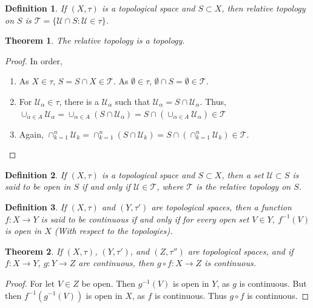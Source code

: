 \documentclass[12pt,oneside]{book}
\theoremstyle{mystyle}
\newtheorem{theorem}{Theorem}[section]
\newtheorem{definition}{Definition}[section]
\begin{document}
\begin{definition}
If $(X,\tau)$ is a topological space and $S\subset X$, then relative topology on $S$ is $\mathscr{T}=\{\mathcal{U}\cap S:\mathcal{U}\in \tau\}$.
\end{definition}

\begin{theorem}
The relative topology is a topology.
\end{theorem}
\begin{proof}
In order,
\begin{enumerate}
\item As $X\in \tau$, $S=S\cap X \in \mathscr{T}$. As $\emptyset\in \tau$, $\emptyset\cap S = \emptyset \in \mathscr{T}$. 
\item For $\mathscr{U}_\alpha\in \mathscr{\tau}$, there is a $\mathcal{U}_\alpha$ such that $\mathscr{U}_\alpha = S\cap \mathcal{U}_\alpha$. Thus, $\cup_{\alpha \in A} \mathscr{U}_\alpha = \cup_{\alpha \in A}(S\cap \mathcal{U}_\alpha) = S\cap (\cup_{\alpha \in A}\mathscr{U}_\alpha)\in \mathscr{T}$
\item Again, $\cap_{k=1}^{n} \mathscr{U}_k = \cap_{k=1}^{n}(S\cap \mathcal{U}_k) = S\cap (\cap_{k=1}^{n} \mathcal{U}_k)\in \mathscr{T}$.
\end{enumerate}
\end{proof}

\begin{definition}
If $(X,\tau)$ is a topological space and $S\subset X$, then a set $\mathcal{U}\subset S$ is said to be open in $S$ if and only if $\mathcal{U}\in \mathscr{T}$, where $\mathscr{T}$ is the relative topology on $S$.
\end{definition}

\begin{definition}
If $(X,\tau)$ and $(Y,\tau')$ are topological spaces, then a function $f:X\rightarrow Y$ is said to be continuous if and only if for every open set $V\in Y$, $f^{-1}(V)$ is open in $X$ (With respect to the topologies).
\end{definition}

\begin{theorem}
If $(X,\tau)$, $(Y,\tau')$, and $(Z,\tau'')$ are topological spaces, and if $f:X\rightarrow Y$, $g:Y\rightarrow Z$ are continuous, then $g\circ f:X\rightarrow Z$ is continuous. 
\end{theorem}
\begin{proof}
For let $V\in Z$ be open. Then $g^{-1}(V)$ is open in $Y$, as $g$ is continuous. But then $f^{-1}(g^{-1}(V))$ is open in $X$, as $f$ is continuous. Thus $g\circ f$ is continuous.
\end{proof}
\end{document}

